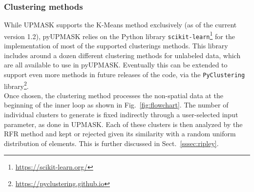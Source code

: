 \documentclass{aa}
\begin{document}
 

\subsubsection{Clustering methods}
 \label{sssec:clustering}

 While UPMASK supports the K-Means method exclusively (as of the current
 version 1.2), pyUPMASK relies on the Python library
 \texttt{scikit-learn}\footnote{\url{https://scikit-learn.org/}}
 \citep{scikit-learn} for the implementation of most of the supported
 clusterings methods. This library includes around a dozen different
 clustering methods for unlabeled data, which are all available to use in
 pyUPMASK. Eventually this can be extended to support even more methods
 in future releases of the code, via the \texttt{PyClustering}
 library\footnote{\url{https://pyclustering.github.io}}.\\

 Once chosen, the clustering method processes the non-spatial data at the
 beginning of the inner loop as shown in Fig.~\ref{fig:flowchart}. The number
 of individual clusters to generate is fixed indirectly through a
 user-selected input parameter, as done in UPMASK.
 Each of these clusters is then analyzed by the RFR method and kept or
 rejected given its similarity with a random uniform distribution of elements.
 This is further discussed in Sect.~\ref{sssec:ripley}.\\
\end{document}
